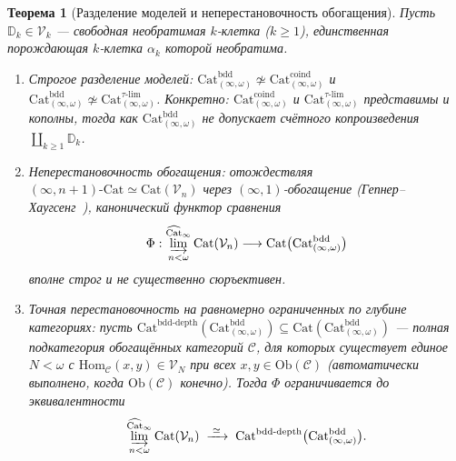 \documentclass[11pt]{article}
\theoremstyle{plain}
\newtheorem{theorem}{Теорема}[section]
\theoremstyle{definition}
\newcommand{\cC}{\mathcal{C}}
\newcommand{\Ob}{\mathrm{Ob}}
\newcommand{\Hom}{\mathrm{Hom}}
\newcommand{\Cat}{\mathrm{Cat}}
\begin{document}
\begin{theorem}[Разделение моделей и неперестановочность обогащения]\label{thm:enrichment-noncommutativity}
Пусть $\mathbb{D}_k \in \mathcal{V}_k$ — свободная необратимая $k$-клетка ($k \ge 1$), единственная порождающая $k$-клетка $\alpha_k$ которой необратима.
\begin{enumerate}[nosep,label=(\roman*)]
\item \emph{Строгое разделение моделей}: $\Cat_{(\infty,\omega)}^{\mathrm{bdd}} \not\simeq \Cat_{(\infty,\omega)}^{\mathrm{coind}}$ и $\Cat_{(\infty,\omega)}^{\mathrm{bdd}} \not\simeq \Cat_{(\infty,\omega)}^{\tau\text{-}\mathrm{lim}}$. Конкретно: $\Cat_{(\infty,\omega)}^{\mathrm{coind}}$ и $\Cat_{(\infty,\omega)}^{\tau\text{-}\mathrm{lim}}$ представимы и кополны, тогда как $\Cat_{(\infty,\omega)}^{\mathrm{bdd}}$ не допускает счётного копроизведения $\coprod_{k \ge 1} \mathbb{D}_k$.
\item \emph{Неперестановочность обогащения}: отождествляя $(\infty, n+1)\text{-}\Cat \simeq \Cat(\mathcal{V}_n)$ через $(\infty, 1)$-обогащение (Гепнер--Хаугсенг~\cite{GepnerHaugseng2015}), канонический функтор сравнения
\[
  \Phi : \varinjlim_{n < \omega}^{\widehat{\Cat}_\infty} \Cat(\mathcal{V}_n) \longrightarrow \Cat\bigl(\Cat_{(\infty,\omega)}^{\mathrm{bdd}}\bigr)
\]
вполне строг и \emph{не} существенно сюръективен.
\item \emph{Точная перестановочность на равномерно ограниченных по глубине категориях}: пусть $\Cat^{\mathrm{bdd\text{-}depth}}(\Cat_{(\infty,\omega)}^{\mathrm{bdd}}) \subseteq \Cat(\Cat_{(\infty,\omega)}^{\mathrm{bdd}})$ — полная подкатегория обогащённых категорий $\cC$, для которых существует единое $N < \omega$ с $\Hom_{\cC}(x, y) \in \mathcal{V}_N$ при всех $x, y \in \Ob(\cC)$ (автоматически выполнено, когда $\Ob(\cC)$ конечно). Тогда $\Phi$ ограничивается до эквивалентности
\[
  \varinjlim_{n < \omega}^{\widehat{\Cat}_\infty} \Cat(\mathcal{V}_n) \;\xrightarrow{\;\simeq\;}\; \Cat^{\mathrm{bdd\text{-}depth}}\bigl(\Cat_{(\infty,\omega)}^{\mathrm{bdd}}\bigr).
\]
\end{enumerate}
\end{theorem}
\end{document}
